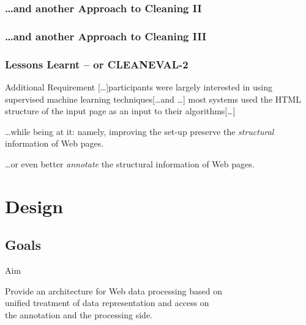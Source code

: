 \documentclass{beamer}
\begin{document}
    \begin{frame}
    \frametitle{\ldots and another Approach to Cleaning II}
        \begin{center}
        \end{center}
    \end{frame}

    \begin{frame}
    \frametitle{\ldots and another Approach to Cleaning III}
        \begin{center}
        \end{center}
    \end{frame}


    \begin{frame}
    \frametitle{Lessons Learnt -- or CLEANEVAL-2}
        \begin{block}{Additional Requirement}
            [\ldots]participants were largely interested in using supervised machine learning techniques[\ldots and \ldots] most systems used the HTML structure of the input page as an input to their algorithms[\ldots]
        \end{block}

\pause

        \begin{block}{\ldots while being at it: namely, improving the set-up}
            preserve the \textit{structural} information of Web pages. 
        \end{block}
	
\pause
	
        \begin{block}{\ldots or even better}
            \textit{annotate} the structural information of Web pages. 
        \end{block}
    \end{frame}


\section{Design}
    \subsection{Goals}
    \begin{frame}{Aim}
            \begin{block}{}
                Provide an architecture for Web data processing based on \\
                unified treatment of data representation and access on \\ 
                the annotation and the processing side.
            \end{block}
        \end{frame}
\end{document}

